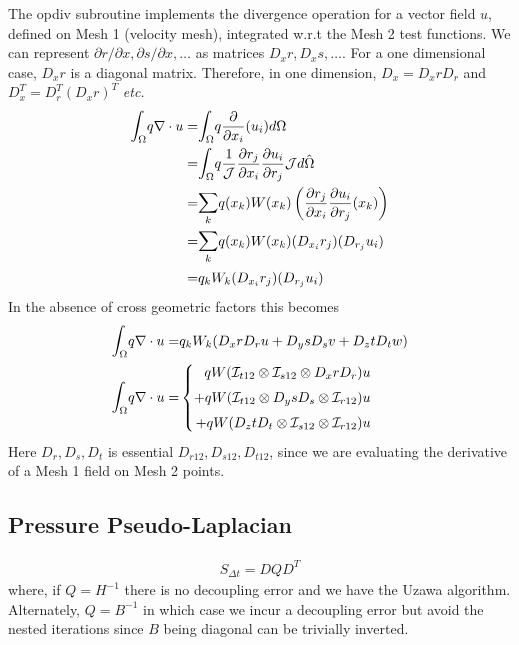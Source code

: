 \documentclass{kthreport}
\begin{document}
The opdiv subroutine implements the divergence operation for a vector field $u$, defined on Mesh 1 (velocity mesh), integrated w.r.t the Mesh 2 test functions. We can represent $\partial r/\partial x, \partial s/\partial x, \ldots$ as matrices $D_{x}r, D_{x}s, \ldots$. For a one dimensional case, $D_{x}r$ is a diagonal matrix. Therefore, in one dimension, $D_{x} = D_{x}rD_{r}$ and $D^{T}_{x} = D^{T}_{r}(D_{x}r)^{T}$ \textit{etc.} 
\begin{eqnarray}
	 \mathlarger\int_{\Omega} q\nabla\cdot u  = & \mathlarger\int_{\Omega} q\dfrac{\partial }{\partial x_{i}}(u_{i}) d\Omega \nonumber \\
	 = & \mathlarger\int_{\Omega} q\dfrac{1}{\mathcal{J}}\dfrac{\partial r_{j}}{\partial x_{i}}\dfrac{\partial u_{i}}{\partial r_{j}} \mathcal{J} d\hat{\Omega} \nonumber \\
	 =& \mathlarger\sum_{k} q(x_{k})W(x_{k})\left(\dfrac{\partial r_{j}}{\partial x_{i}}\dfrac{\partial u_{i}}{\partial r_{j}}(x_{k})\right)  \nonumber \\
	 =& \mathlarger\sum_{k} q(x_{k})W(x_{k})(D_{x_{i}}r_{j})(D_{r_{j}}u_{i})  \nonumber \\
	 =&  q_{k}W_{k}(D_{x_{i}}r_{j})(D_{r_{j}}u_{i})  \nonumber
\end{eqnarray}
In the absence of cross geometric factors this becomes
\begin{eqnarray}
	 \mathlarger\int_{\Omega} q\nabla\cdot u  = &  q_{k}W_{k}(D_{x}rD_{r}u + D_{y}sD_{s}v + D_{z}tD_{t}w)  \nonumber \\
	 \mathlarger\int_{\Omega} q\nabla\cdot u  = & \left\{
	 \begin{split}
	    qW(\mathcal{I}_{t12}\otimes\mathcal{I}_{s12}\otimes D_{x}rD_{r})u \\ 
	    + qW(\mathcal{I}_{t12}\otimes D_{y}sD_{s}\otimes\mathcal{I}_{r12})u \\ 
	    + qW(D_{z}tD_{t}\otimes\mathcal{I}_{s12}\otimes \mathcal{I}_{r12})u
 	 \end{split}\right.
\end{eqnarray}
Here $D_{r},D_{s},D_{t}$ is essential $D_{r12},D_{s12},D_{t12}$, since we are evaluating the derivative of a Mesh 1 field on Mesh 2 points.


\subsection{Pressure Pseudo-Laplacian}

\begin{eqnarray}
	S_{\Delta t} = D QD^{T} \label{eqn:pressure_pseudo_laplacian}
\end{eqnarray}
where, if $Q=H^{-1}$ there is no decoupling error and we have the Uzawa algorithm. Alternately, $Q=B^{-1}$ in which case we incur a decoupling error but avoid the nested iterations since $B$ being diagonal can be trivially inverted. 
\end{document}
